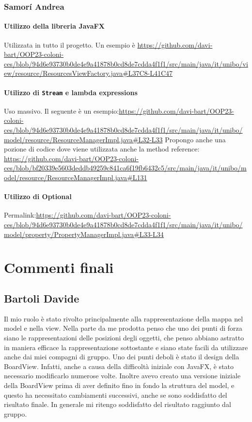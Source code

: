 \documentclass[a4paper,12pt]{report}
\begin{document}
\subsection{Samor\'i Andrea}
\subsubsection{Utilizzo della libreria JavaFX}
Utilizzata in tutto il progetto. Un esempio \`e \url{https://github.com/davi-bart/OOP23-coloni-ces/blob/94d6e93730b0de4e9a41878b0cd8de7cdda4f1f1/src/main/java/it/unibo/view/resource/ResourcesViewFactory.java#L37C8-L41C47}
\subsubsection{Utilizzo di \texttt{Stream} e lambda expressions}
Uso massivo. Il seguente \`e un esempio:\url{https://github.com/davi-bart/OOP23-coloni-ces/blob/94d6e93730b0de4e9a41878b0cd8de7cdda4f1f1/src/main/java/it/unibo/model/resource/ResourceManagerImpl.java#L32-L33}
Propongo anche una pozione di codice dove viene utilizzata anche la method reference: \url{https://github.com/davi-bart/OOP23-coloni-ces/blob/bf20339e5603deddb49259c841ca6f19fb6432c5/src/main/java/it/unibo/model/resource/ResourceManagerImpl.java#L131}
\subsubsection{Utilizzo di Optional}
Permalink:\url{https://github.com/davi-bart/OOP23-coloni-ces/blob/94d6e93730b0de4e9a41878b0cd8de7cdda4f1f1/src/main/java/it/unibo/model/property/PropertyManagerImpl.java#L33-L34}

\chapter{Commenti finali}
\section{Bartoli Davide}
Il mio ruolo è stato rivolto principalmente alla rappresentazione della mappa nel model e nella view.
Nella parte da me prodotta penso che uno dei punti di forza siano le rappresentazioni delle posizioni degli oggetti, che penso abbiano astratto in maniera efficace la rappresentazione sottostante e siano state facili da utilizzare anche dai miei compagni di gruppo. 
Uno dei punti deboli è stato il design della BoardView. Infatti, anche a causa della difficoltà iniziale con JavaFX, è stato necessario modificarlo numerose volte. Inoltre avevo creato una versione iniziale della BoardView prima di aver definito fino in fondo la struttura del model, e questo ha necessitato cambiamenti successivi, anche se sono soddisfatto del risultato finale.
In generale mi ritengo soddisfatto del risultato raggiunto dal gruppo.
\end{document}
